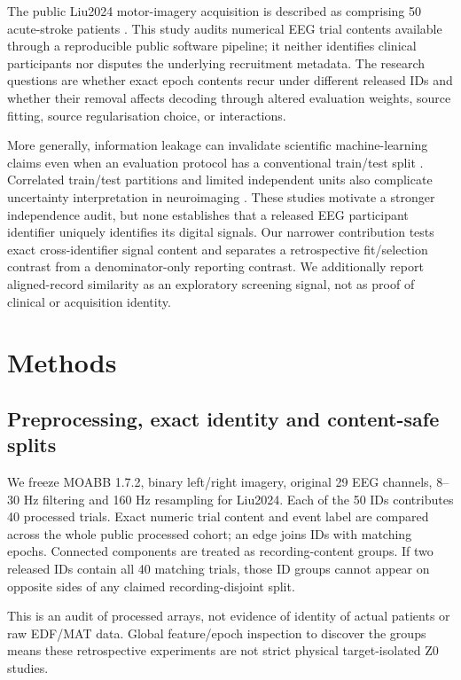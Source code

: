 \documentclass[preprint,12pt]{elsarticle}
\begin{document}
The public Liu2024 motor-imagery acquisition is described as comprising
50 acute-stroke patients \cite{liu2024stroke}. This study audits numerical
EEG trial contents available through a reproducible public software
pipeline; it neither identifies clinical participants nor disputes the
underlying recruitment metadata. The research questions are whether
exact epoch contents recur under different released IDs and whether
their removal affects decoding through altered evaluation weights,
source fitting, source regularisation choice, or interactions.

More generally, information leakage can invalidate scientific
machine-learning claims even when an evaluation protocol has a
conventional train/test split \cite{kaufman2012leakage,kapoor2023leakage}.
Correlated train/test partitions and limited independent units also
complicate uncertainty interpretation in neuroimaging
\cite{varoquaux2018cv}. These studies motivate a stronger
independence audit, but none establishes that a released EEG
participant identifier uniquely identifies its digital signals.
Our narrower contribution tests exact cross-identifier signal
content and separates a retrospective fit/selection contrast
from a denominator-only reporting contrast. We additionally
report aligned-record similarity as an exploratory screening
signal, not as proof of clinical or acquisition identity.

\section{Methods}
\subsection{Preprocessing, exact identity and content-safe splits}
We freeze MOABB 1.7.2, binary left/right imagery, original 29 EEG
channels, 8--30 Hz filtering and 160 Hz resampling for Liu2024.
Each of the 50 IDs contributes 40 processed trials. Exact numeric
trial content and event label are compared across the whole
public processed cohort; an edge joins IDs with matching epochs.
Connected components are treated as recording-content groups. If two
released IDs contain all 40 matching trials, those ID groups cannot
appear on opposite sides of any claimed recording-disjoint split.

This is an audit of processed arrays, not evidence of identity
of actual patients or raw EDF/MAT data. Global feature/epoch
inspection to discover the groups means these retrospective
experiments are not strict physical target-isolated Z0 studies.
\end{document}
